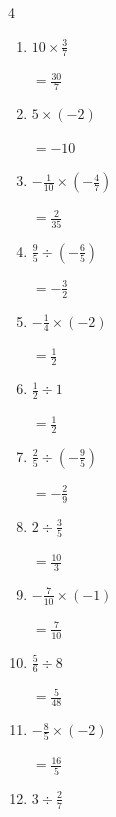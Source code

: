 \begin{multicols}{4}
\begin{enumerate}
        $\displaystyle =\frac{9}{20}$

  \item $\displaystyle 10\times{}\frac{3}{7}$

        $\displaystyle =\frac{30}{7}$

  \item $\displaystyle 5\times{}\left(-2\right)$

        $\displaystyle =-10$

  \item $\displaystyle -\frac{1}{10}\times{}\left(-\frac{4}{7}\right)$

        $\displaystyle =\frac{2}{35}$

  \item $\displaystyle \frac{9}{5}\div{}\left(-\frac{6}{5}\right)$

        $\displaystyle =-\frac{3}{2}$

\columnbreak %

\resetques

  \item $\displaystyle -\frac{1}{4}\times{}\left(-2\right)$

        $\displaystyle =\frac{1}{2}$

  \item $\displaystyle \frac{1}{2}\div{}1$

        $\displaystyle =\frac{1}{2}$

  \item $\displaystyle \frac{2}{5}\div{}\left(-\frac{9}{5}\right)$

        $\displaystyle =-\frac{2}{9}$

  \item $\displaystyle 2\div{}\frac{3}{5}$

        $\displaystyle =\frac{10}{3}$

  \item $\displaystyle -\frac{7}{10}\times{}\left(-1\right)$

        $\displaystyle =\frac{7}{10}$

  \item $\displaystyle \frac{5}{6}\div{}8$

        $\displaystyle =\frac{5}{48}$

  \item $\displaystyle -\frac{8}{5}\times{}\left(-2\right)$

        $\displaystyle =\frac{16}{5}$

  \item $\displaystyle 3\div{}\frac{2}{7}$


\end{enumerate}
\end{multicols}
